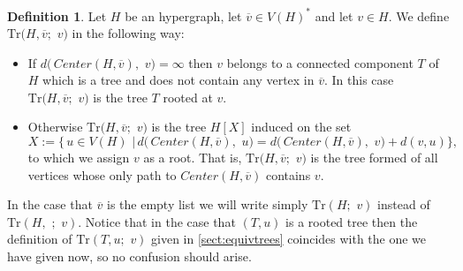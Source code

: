 \documentclass[12pt,notitlepage,a4paper]{article}
\theoremstyle{definition}
\newtheorem{definition}{Definition}[section]
\newcommand{\N}{\mathbb{N}}
\begin{document}
\begin{definition}\label{def:TrOperator}
	Let $H$ be an hypergraph, let $\overline{v}\in V(H)^*$ and 
	let $v\in H$. We define $\mathrm{Tr}\big(
	H,\overline{v};\,\, v\big)$ in the following way:
	\begin{itemize}[leftmargin=*]
		\item If $d\big(\, Center(H, \overline{v})
		, \, \, v \big)=\infty$ then $v$ belongs to a connected
		component $T$ of $H$ which is a tree and does not contain
		any vertex in $\overline{v}$. In this case
		$\mathrm{Tr}\big(
		H,\overline{v};\,\, v\big)$ is the tree $T$ rooted at $v$.
		\item Otherwise $\mathrm{Tr}\big(
		H,\overline{v};\,\, v\big)$ is the tree $H[X]$ 
		induced on the set 
		\[
		X:=\big\{\, u\in V(H) \,\, \big| \, 
		d\big(\, Center(H, \overline{v})
		, \, \, u \big)= d\big(\, Center(H, \overline{v})
		, \, \, v \big) + d(v,u)
		\big\},
		\]
		to which we assign $v$ as a root. That is,
		$\mathrm{Tr}\big(
		H,\overline{v};\,\, v\big)$ is the tree formed of all 
		vertices whose only path to $Center(H,\overline{v})$ 
		contains $v$. 		
	\end{itemize}
	In the case that $\overline{v}$ is the empty list we will write
	simply $\mathrm{Tr}(H;\,\, v)$ 
	instead of 
	$\mathrm{Tr}(H,\, \, ;\,\, v)$.
	Notice that in the case that
	$(T,u)$ is a rooted tree then the definition of 
	$\mathrm{Tr}(T,u;\, \, v)$ given in \cref{sect:equivtrees}
	coincides with the one we have
	given now,
	so no confusion should arise. \par
\end{definition}
\end{document}
